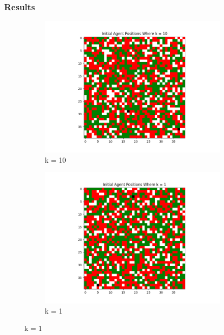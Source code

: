 \documentclass[11pt]{article}
\begin{document}
	\subsubsection{Results}
	\begin{figure}[h]
		\centering
		\begin{subfigure}{0.2\textwidth}
			\includegraphics[width=\linewidth]{policy3_Initial_10.png}
			\caption{\centering k = 10}
		\end{subfigure}\hfill
		\begin{subfigure}{0.2\textwidth}
			\includegraphics[width=\linewidth]{policy3_Initial_1.png}
			\caption{\centering k = 1}
		\end{subfigure}\hfill

\end{figure}
\end{document}
